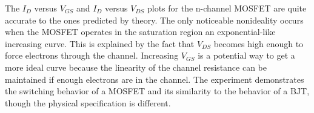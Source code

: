 The $I_D$ versus $V_{GS}$ and $I_D$ versus $V_{DS}$ plots for the n-channel MOSFET are quite accurate to the ones predicted by theory. The only noticeable nonideality occurs when the MOSFET operates in the saturation region an exponential-like increasing curve. This is explained by the fact that $V_{DS}$ becomes high enough to force electrons through the channel. Increasing $V_{GS}$ is a potential way to get a more ideal curve because the linearity of the channel resistance can be maintained if enough electrons are in the channel. The experiment demonstrates the switching behavior of a MOSFET and its similarity to the behavior of a BJT, though the physical specification is different.
